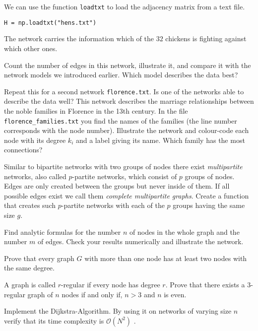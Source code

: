 We can use the function {\tt loadtxt} to load the adjacency matrix from a text file.

\begin{lstlisting}
H = np.loadtxt("hens.txt")
\end{lstlisting}

The network carries the information which of the $32$ chickens is fighting against which other ones.

Count the number of edges in this network, illustrate it, and compare it with the network models we introduced earlier. Which model describes the data best?


Repeat this for a second network {\tt florence.txt}. Is one of the
networks able to describe the data well? This network describes the
marriage relationships between the noble families in Florence in the
13th century. In the file {\tt florence\_families.txt}  you find the
names of the families (the line number corresponds with the node
number). Illustrate the network and colour-code each node with its
degree $k_i$ and a label giving its name. Which family has the most
connections?



\exercise[%
  topic=Optional Tasks
    ]

\subexercise[%
  topic=Multipartite Networks,
    ]

Similar to bipartite networks with two groups of nodes there exist
\emph{multipartite} networks, also called $p$-partite networks, which
consist of $p$ groups of nodes. Edges are only created between the
groups but never inside of them. If all possible edges exist we call
them \emph{complete multipartite graphs}. Create a function that creates
such $p$-partite networks with each of the $p$ groups having the same
size $g$.

Find analytic formulas for the number $n$ of nodes in the whole graph and the number $m$ of edges. Check your results numerically and illustrate the network.
		
		\subexercise[%
  topic=Nodes with Equal Degree,
    ]
    
    Prove that every graph $G$ with more than one node has at least two nodes with the same degree.
    
 
\subexercise[%
  topic=$3$-regular graphs,
    ]
    
    A graph is called $r$-regular if every node has degree $r$. Prove that there exists a $3$-regular graph of $n$ nodes if and only if, $n>3$ and $n$ is even.
    		
		
		\subexercise[%
  topic=Dijkstra-Algorithm,
    ]
	
	Implement the Dijkstra-Algorithm. By using it on networks of varying size $n$ verify that its time complexity is $\mathcal{O}(N^2)$ .
	

		


